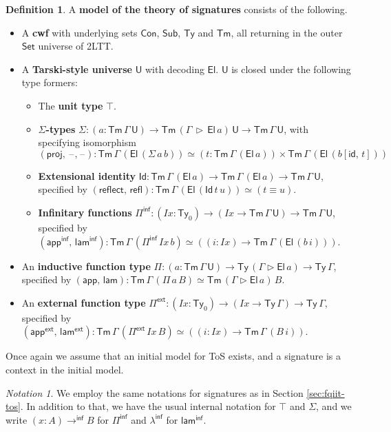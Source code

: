\documentclass[12pt,a4paper,twoside,openany]{book}
\theoremstyle{remark}
\newtheorem{notation}{Notation}
\theoremstyle{definition}
\newtheorem{mydefinition}{Definition}
\theoremstyle{theorem}
\newcommand{\mi}[1]{\mathit{#1}}
\newcommand{\ms}[1]{\mathsf{#1}}
\newcommand{\refl}{\mathsf{refl}}
\newcommand{\reflect}{\mathsf{reflect}}
\newcommand{\id}{\mathsf{id}}
\newcommand{\Con}{\mathsf{Con}}
\newcommand{\Sub}{\mathsf{Sub}}
\newcommand{\Tm}{\mathsf{Tm}}
\newcommand{\Ty}{\mathsf{Ty}}
\newcommand{\U}{\mathsf{U}}
\newcommand{\El}{\mathsf{El}}
\newcommand{\Id}{\mathsf{Id}}
\newcommand{\proj}{\mathsf{proj}}
\newcommand{\blank}{\mathord{\hspace{1pt}\text{--}\hspace{1pt}}}
\newcommand{\Set}{\mathsf{Set}}
\newcommand{\ext}{\triangleright}
\newcommand{\Pie}{\Pi^{\mathsf{ext}}}
\newcommand{\appe}{\mathsf{app^{ext}}}
\newcommand{\lame}{\mathsf{lam^{ext}}}
\newcommand{\Piinf}{\Pi^{\mathsf{inf}}}
\newcommand{\appinf}{\mathsf{app^{inf}}}
\newcommand{\laminf}{\mathsf{lam^{inf}}}
\newcommand{\toinf}{\to^{\ms{inf}}}
\newcommand{\lambdainf}{\lambda^{\ms{inf}}}
\newcommand{\app}{\ms{app}}
\newcommand{\lam}{\ms{lam}}
\begin{document}
\begin{mydefinition}
\label{def:iqiit-tos}
A \textbf{model of the theory of signatures} consists of the following.
  \begin{itemize}
    \item A \textbf{cwf} with underlying sets $\Con$, $\Sub$, $\Ty$ and $\Tm$, all returning in
      the outer $\Set$ universe of 2LTT.
    \item A \textbf{Tarski-style universe} $\U$ with decoding $\El$. $\U$ is closed under the following type formers:
      \begin{itemize}
        \item The \textbf{unit type} $\top$.
        \item \textbf{$\Sigma$-types} $\Sigma : (a : \Tm\,\Gamma\,\U) \to \Tm\,(\Gamma\,\ext\,\El\,a)\,\U \to \Tm\,\Gamma\,\U$, with specifying isomorphism
          \[(\proj,\,\blank\!,\!\blank) : \Tm\,\Gamma\,(\El\,(\Sigma\,a\,b))\simeq (t : \Tm\,\Gamma\,(\El\,a)) \times \Tm\,\Gamma\,(\El\,(b[\id,\,t]))\]
        \item \textbf{Extensional identity} $\Id : \Tm\,\Gamma\,(\El\,a) \to \Tm\,\Gamma\,(\El\,a) \to \Tm\,\Gamma\,\U$,
          specified by $(\reflect,\,\refl) : \Tm\,\Gamma\,(\El\,(\Id\,t\,u)) \simeq (t \equiv u)$.
        \item \textbf{Infinitary functions} $\Piinf : (\mi{Ix} : \Ty_0) \to (\mi{Ix} \to \Tm\,\Gamma\,\U) \to \Tm\,\Gamma\,\U$, specified by $(\appinf,\,\laminf) : \Tm\,\Gamma\,(\Piinf\,\mi{Ix}\,b) \simeq ((i : \mi{Ix}) \to \Tm\,\Gamma\,(\El\,(b\,i)))$.
      \end{itemize}
    \item An \textbf{inductive function type} $\Pi : (a : \Tm\,\Gamma\,\U) \to
      \Ty\,(\Gamma\ext\El\,a) \to \Ty\,\Gamma$, specified by
      $(\app,\,\lam) : \Tm\,\Gamma\,(\Pi\,a\,B) \simeq \Tm\,(\Gamma \ext \El\,a)\,B$.
    \item An \textbf{external function type} $\Pie : (\mi{Ix} : \Ty_0) \to (\mi{Ix} \to \Ty\,\Gamma) \to \Ty\,\Gamma$, specified by
      $(\appe,\,\lame) : \Tm\,\Gamma\,(\Pie\,\mi{Ix}\,B) \simeq ((i : \mi{Ix}) \to \Tm\,\Gamma\,(B\,i))$.
  \end{itemize}
\end{mydefinition}
Once again we assume that an initial model for ToS exists, and a signature is a
context in the initial model.

\begin{notation}
  We employ the same notations for signatures as in Section \ref{sec:fqiit-tos}. In addition to that,
  we have the usual internal notation for $\top$ and $\Sigma$, and we write $(x : A) \toinf B$ for $\Piinf$
  and $\lambdainf$ for $\laminf$.
\end{notation}
\end{document}
